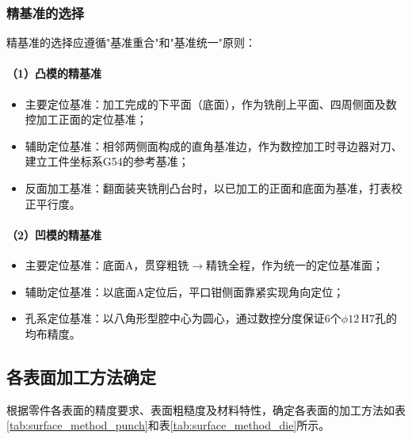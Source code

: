 \documentclass{xautCADreport}
\begin{document}
\subsubsection{精基准的选择}

精基准的选择应遵循"基准重合"和"基准统一"原则：

\paragraph{（1）凸模的精基准}

\begin{itemize}
  \item 主要定位基准：加工完成的下平面（底面），作为铣削上平面、四周侧面及数控加工正面的定位基准；
  \item 辅助定位基准：相邻两侧面构成的直角基准边，作为数控加工时寻边器对刀、建立工件坐标系G54的参考基准；
  \item 反面加工基准：翻面装夹铣削凸台时，以已加工的正面和底面为基准，打表校正平行度。
\end{itemize}

\paragraph{（2）凹模的精基准}

\begin{itemize}
  \item 主要定位基准：底面A，贯穿粗铣$\to$精铣全程，作为统一的定位基准面；
  \item 辅助定位基准：以底面A定位后，平口钳侧面靠紧实现角向定位；
  \item 孔系定位基准：以八角形型腔中心为圆心，通过数控分度保证6个$\phi12\,\mathrm{H7}$孔的均布精度。
\end{itemize}

\subsection{各表面加工方法确定}

根据零件各表面的精度要求、表面粗糙度及材料特性，确定各表面的加工方法如表\ref{tab:surface_method_punch}和表\ref{tab:surface_method_die}所示。
\end{document}
